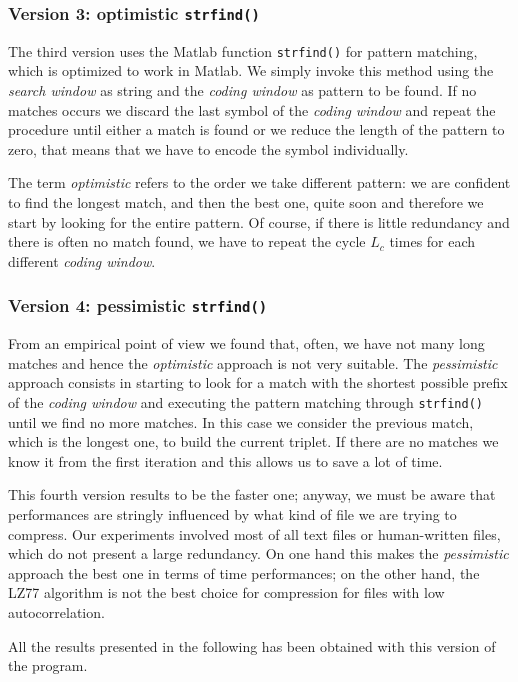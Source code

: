 \subsubsection{Version 3: optimistic \texttt{strfind()}}
The third version uses the Matlab function \texttt{strfind()} for pattern matching, which is optimized to work in Matlab. We simply invoke this method using the \textit{search window} as string and the \textit{coding window} as pattern to be found. If no matches occurs we discard the last symbol of the \textit{coding window} and repeat the procedure until either a match is found or we reduce the length of the pattern to zero, that means that we have to encode the symbol individually.

The term \textit{optimistic} refers to the order we take different pattern: we are confident to find the longest match, and then the best one, quite soon and therefore we start by looking for the entire pattern. Of course, if there is little redundancy and there is often no match found, we have to repeat the cycle $L_c$ times for each different \textit{coding window}.

\subsubsection{Version 4: pessimistic \texttt{strfind()}} \label{subsubsec:pess}
From an empirical point of view we found that, often, we have not many long matches and hence the \textit{optimistic} approach is not very suitable. The \textit{pessimistic} approach consists in starting to look for a match with the shortest possible prefix of the \textit{coding window} and executing the pattern matching through \texttt{strfind()} until we find no more matches. In this case we consider the previous match, which is the longest one, to build the current triplet. If there are no matches we know it from the first iteration and this allows us to save a lot of time.

This fourth version results to be the faster one; anyway, we must be aware that performances are stringly influenced by what kind of file we are trying to compress. Our experiments involved most of all text files or human-written files, which do not present a large redundancy. On one hand this makes the \textit{pessimistic} approach the best one in terms of time performances; on the other hand, the LZ77 algorithm is not the best choice for compression for files with low autocorrelation.

All the results presented in the following has been obtained with this version of the program.